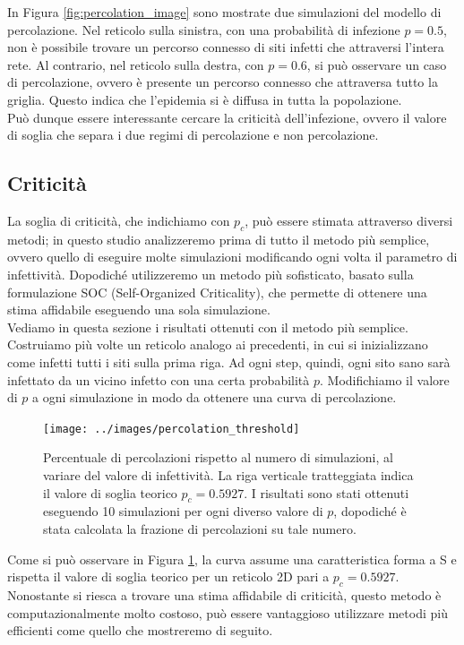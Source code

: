 \documentclass{article}
\begin{document}
    In Figura \ref{fig:percolation_image} sono mostrate due simulazioni del modello di percolazione. Nel reticolo sulla
    sinistra, con una probabilità di infezione $p=0.5$, non è possibile trovare un percorso connesso di siti infetti che
    attraversi l'intera rete. Al contrario, nel reticolo sulla destra, con $p=0.6$, si può osservare un caso di percolazione,
    ovvero è presente un percorso connesso che attraversa tutto la griglia. Questo indica che l'epidemia si è diffusa in
    tutta la popolazione.\\
    Può dunque essere interessante cercare la criticità dell'infezione, ovvero il valore di soglia che separa i due
    regimi di percolazione e non percolazione.
    \subsection{Criticità}
    La soglia di criticità, che indichiamo con $p_c$, può essere stimata attraverso diversi metodi; in questo studio
    analizzeremo prima di tutto il metodo più semplice, ovvero quello di eseguire molte simulazioni modificando ogni
    volta il parametro di infettività.
    Dopodiché utilizzeremo un metodo più sofisticato, basato sulla formulazione SOC (Self-Organized Criticality), che
    permette di ottenere una stima affidabile eseguendo una sola simulazione.\\
    Vediamo in questa sezione i risultati ottenuti con il metodo più semplice. Costruiamo più volte un reticolo
    analogo ai precedenti, in cui si inizializzano come infetti tutti i siti sulla prima riga. Ad ogni step, quindi,
    ogni sito sano sarà infettato da un vicino infetto con una certa probabilità $p$. Modifichiamo il valore di $p$ a
    ogni simulazione in modo da ottenere una curva di percolazione.
    \begin{figure}[H]
        \centering
        \texttt{[image: ../images/percolation\_threshold]}
        \caption{Percentuale di percolazioni rispetto al numero di simulazioni, al variare del valore di infettività.
                    La riga verticale tratteggiata indica il valore di soglia teorico $p_c=0.5927$. I risultati sono stati ottenuti eseguendo 10 simulazioni per
                    ogni diverso valore di $p$, dopodiché è stata calcolata la frazione di percolazioni su tale numero.}
        \label{fig:percolation_critical}
    \end{figure}
    Come si può osservare in Figura \ref{fig:percolation_critical}, la curva assume una caratteristica forma a S e rispetta
    il valore di soglia teorico per un reticolo 2D pari a $p_c = 0.5927$.
    Nonostante si riesca a trovare una stima affidabile di criticità, questo metodo è computazionalmente molto costoso,
    può essere vantaggioso utilizzare metodi più efficienti come quello che mostreremo di seguito.
\end{document}
